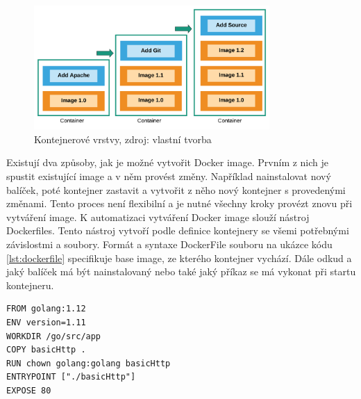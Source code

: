 \begin{figure}[H]
  \begin{centering}
    
    \includegraphics[width=0.8\textwidth]{images/docker-layers.png}
    \par
	  \caption{Kontejnerové vrstvy\label{fig:container-layers}, zdroj: vlastní tvorba}
    \end{centering}
\end{figure}

Existují dva způsoby, jak je možné vytvořit Docker image. Prvním z nich je spustit existující image a v něm provést změny. Například nainstalovat nový balíček, poté kontejner zastavit a vytvořit z něho nový kontejner s provedenými změnami. Tento proces není flexibilní a je nutné všechny kroky provézt znovu při vytváření image. \linebreak K automatizaci vytváření Docker image slouží nástroj Dockerfiles. Tento nástroj vytvoří podle definice kontejnery se všemi potřebnými závislostmi a soubory. Formát a syntaxe DockerFile souboru na ukázce kódu \ref{lst:dockerfile} specifikuje base image, ze kterého kontejner vychází. Dále odkud a jaký balíček má být nainstalovaný nebo také jaký příkaz se má vykonat při startu kontejneru. \par

\begin{centering}
	\begin{lstlisting}[caption={Příklad Docker file souboru},label=lst:dockerfile]
FROM golang:1.12
ENV version=1.11
WORKDIR /go/src/app
COPY basicHttp .
RUN chown golang:golang basicHttp
ENTRYPOINT ["./basicHttp"]
EXPOSE 80
\end{lstlisting}
\end{centering}

